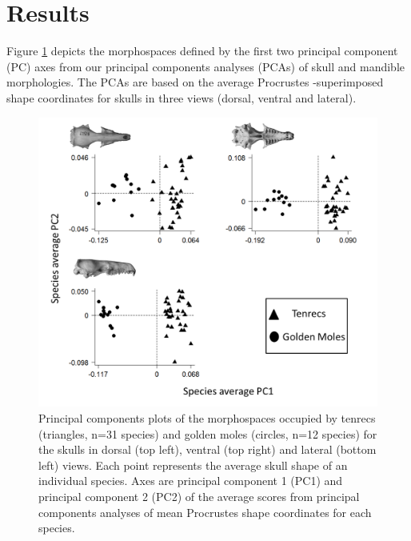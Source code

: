 \documentclass[12pt,a4paper]{article}
\begin{document}
\section{Results} %
	Figure \ref{fig:threePCA} depicts the morphospaces defined by the first two principal component (PC) axes from our principal components analyses (PCAs) of skull and mandible morphologies. The PCAs are based on the average Procrustes -superimposed shape coordinates for skulls in three views (dorsal, ventral and lateral).
	\begin{figure}[!htbp]
	\centering
	\includegraphics[width=1\linewidth, height=1\textheight, keepaspectratio]{figures/PCA_threeplot.png}
	\caption[Morphospace (principal components) plot of morphological diversity in tenrec and golden mole skulls.]
		{Principal components plots of the morphospaces occupied by tenrecs (triangles, n=31 species) and golden moles (circles, n=12 species) for the skulls in dorsal (top left), ventral (top right) and lateral (bottom left) views. Each point represents the average skull shape of an individual species. Axes are principal component 1 (PC1) and principal component 2 (PC2) of the average scores from principal components analyses of mean Procrustes shape coordinates for each species.}
	\label{fig:threePCA}
	\end{figure}
\end{document}

